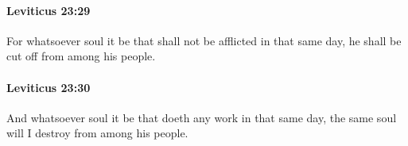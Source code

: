 		\paragraph{Leviticus 23:29} %
			\label{LEVITICUS-23-29}

			For whatsoever soul it be that shall not be afflicted in that same day, he shall be cut off from among his people.


		\paragraph{Leviticus 23:30} %
			\label{LEVITICUS-23-30}

			And whatsoever soul it be that doeth any work in that same day, the same soul will I destroy from among his people.



